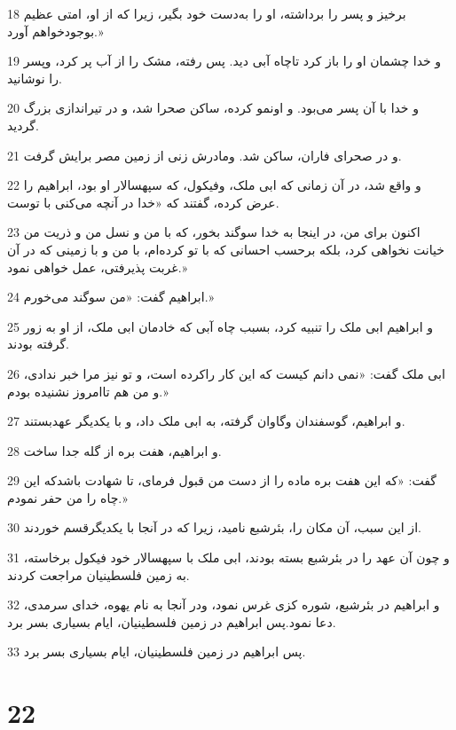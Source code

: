 \par 18 برخیز و پسر را برداشته، او را به‌دست خود بگیر، زیرا که از او، امتی عظیم بوجودخواهم آورد.»
\par 19 و خدا چشمان او را باز کرد تاچاه آبی دید. پس رفته، مشک را از آب پر کرد، وپسر را نوشانید.
\par 20 و خدا با آن پسر می‌بود. و اونمو کرده، ساکن صحرا شد، و در تیراندازی بزرگ گردید.
\par 21 و در صحرای فاران، ساکن شد. ومادرش زنی از زمین مصر برایش گرفت.
\par 22 و واقع شد، در آن زمانی که ابی ملک، وفیکول، که سپهسالار او بود، ابراهیم را عرض کرده، گفتند که «خدا در آنچه می‌کنی با توست.
\par 23 اکنون برای من، در اینجا به خدا سوگند بخور، که با من و نسل من و ذریت من خیانت نخواهی کرد، بلکه برحسب احسانی که با تو کرده‌ام، با من و با زمینی که در آن غربت پذیرفتی، عمل خواهی نمود.»
\par 24 ابراهیم گفت: «من سوگند می‌خورم.»
\par 25 و ابراهیم ابی ملک را تنبیه کرد، بسبب چاه آبی که خادمان ابی ملک، از او به زور گرفته بودند.
\par 26 ابی ملک گفت: «نمی دانم کیست که این کار راکرده است، و تو نیز مرا خبر ندادی، و من هم تاامروز نشنیده بودم.»
\par 27 و ابراهیم، گوسفندان وگاوان گرفته، به ابی ملک داد، و با یکدیگر عهدبستند.
\par 28 و ابراهیم، هفت بره از گله جدا ساخت.
\par 29 گفت: «که این هفت بره ماده را از دست من قبول فرمای، تا شهادت باشدکه این چاه را من حفر نمودم.»
\par 30 از این سبب، آن مکان را، بئرشبع نامید، زیرا که در آنجا با یکدیگرقسم خوردند.
\par 31 و چون آن عهد را در بئرشبع بسته بودند، ابی ملک با سپهسالار خود فیکول برخاسته، به زمین فلسطینیان مراجعت کردند.
\par 32 و ابراهیم در بئرشبع، شوره کزی غرس نمود، ودر آنجا به نام یهوه، خدای سرمدی، دعا نمود.پس ابراهیم در زمین فلسطینیان، ایام بسیاری بسر برد.
\par 33 پس ابراهیم در زمین فلسطینیان، ایام بسیاری بسر برد.
 
\chapter{22}

